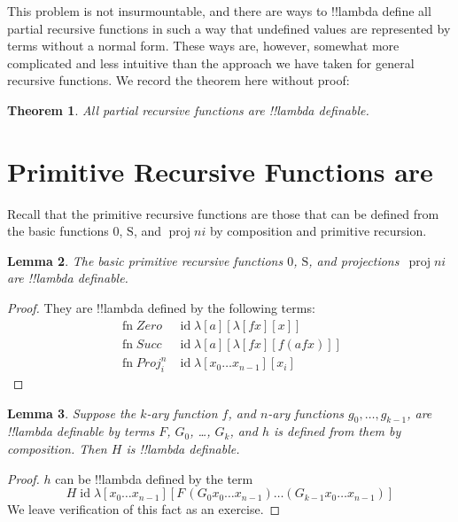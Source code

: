 \documentclass[10pt,a4paper]{article}
\theoremstyle{plain}
\newtheorem{thm}{Theorem}[section]
\newtheorem{lem}[thm]{Lemma}
\theoremstyle{definition}
\theoremstyle{remark}
\newcommand*{\olfileid}[3]{}
\newcommand*{\olsection}[1]{\section*{#1}}
\newcommand*{\ollabel}[1]{\label{#1}}
\providecommand{\Zero}{\ensuremath{0}}
\providecommand{\Succ}{\ensuremath{\mathrm{S}}}
\providecommand{\lambd}{\ensuremath{\lambda}}
\providecommand{\Proj}{\operatorname{proj}}
\providecommand{\ident}{\operatorname{id}}
\providecommand{\fn}{\operatorname{fn}}
\providecommand{\fn}{\operatorname{fn}}
\begin{document}
This problem is not insurmountable, and there are ways to
!!{lambda define} all partial recursive functions in such a way that
undefined values are represented by terms without a normal form.
These ways are, however, somewhat more complicated and less intuitive
than the approach we have taken for general recursive functions. We
record the theorem here without proof:

\begin{thm}
  All partial recursive functions are !!{lambda definable}.
\end{thm}






\olfileid{lam}{ldf}{prf}
\olsection{Primitive Recursive Functions are \usetoken{S}{lambda definable}} 

Recall that the primitive recursive functions are those that can be
defined from the basic functions $\Zero$, $\Succ$, and $\Proj{n}{i}$
by composition and primitive recursion.

\begin{lem}
  \ollabel{lem:basic}
  The basic primitive recursive functions $\Zero$, $\Succ$, and
  projections~$\Proj{n}{i}$ are !!{lambda definable}.
\end{lem}

\begin{proof}
They are !!{lambda define}d by the following terms:
\begin{align*}
  \fn{Zero} & \ident \lambd[a][\lambd[fx][x]]\\
  \fn{Succ} & \ident \lambd[a][\lambd[fx][f (a f x)]] \\
  \fn{Proj}^n_i & \ident \lambd[x_0\dots x_{n-1}][x_i]
\end{align*}
\end{proof}

\begin{lem}
  \ollabel{lem:comp} Suppose the $k$-ary function $f$, and $n$-ary
  functions $g_0, \dots, g_{k-1}$, are !!{lambda definable} by terms
  $F$, $G_0$, \dots, $G_k$, and $h$ is defined from them by composition.
  Then $H$ is !!{lambda definable}.
\end{lem}

\begin{proof}
  $h$ can be !!{lambda define}d by the term
  \[
  H \ident \lambd[x_0 \dots x_{n-1}][F\, (G_0 x_0 \dots
    x_{n-1}) \dots (G_{k-1} x_0 \dots x_{n-1})]
  \]
  We leave verification of this fact as an exercise.
\end{proof}
\end{document}
